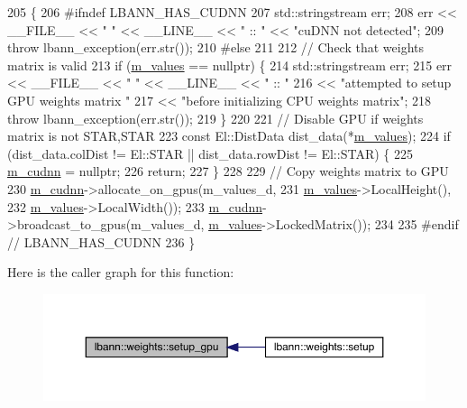 \begin{DoxyCode}
205                         \{
206 \textcolor{preprocessor}{  #ifndef LBANN\_HAS\_CUDNN}
207   std::stringstream err;
208   err << \_\_FILE\_\_ << \textcolor{stringliteral}{" "} << \_\_LINE\_\_ << \textcolor{stringliteral}{" :: "} << \textcolor{stringliteral}{"cuDNN not detected"};
209   \textcolor{keywordflow}{throw} lbann\_exception(err.str());
210 \textcolor{preprocessor}{  #else}
211 
212   \textcolor{comment}{// Check that weights matrix is valid}
213   \textcolor{keywordflow}{if} (\hyperlink{classlbann_1_1weights_a6b2df671b6d4c4dd595477971eea0543}{m\_values} == \textcolor{keyword}{nullptr}) \{
214     std::stringstream err;
215     err << \_\_FILE\_\_ << \textcolor{stringliteral}{" "} << \_\_LINE\_\_ << \textcolor{stringliteral}{" :: "}
216         << \textcolor{stringliteral}{"attempted to setup GPU weights matrix "}
217         << \textcolor{stringliteral}{"before initializing CPU weights matrix"};
218     \textcolor{keywordflow}{throw} lbann\_exception(err.str());
219   \}
220 
221   \textcolor{comment}{// Disable GPU if weights matrix is not STAR,STAR}
223 \textcolor{comment}{}  \textcolor{keyword}{const} El::DistData dist\_data(*\hyperlink{classlbann_1_1weights_a6b2df671b6d4c4dd595477971eea0543}{m\_values});
224   \textcolor{keywordflow}{if} (dist\_data.colDist != El::STAR || dist\_data.rowDist != El::STAR) \{
225     \hyperlink{classlbann_1_1weights_a873e8c14998915e442d03b8dd7d2fdf7}{m\_cudnn} = \textcolor{keyword}{nullptr};
226     \textcolor{keywordflow}{return};
227   \}
228 
229   \textcolor{comment}{// Copy weights matrix to GPU}
230   \hyperlink{classlbann_1_1weights_a873e8c14998915e442d03b8dd7d2fdf7}{m\_cudnn}->allocate\_on\_gpus(m\_values\_d,
231                             \hyperlink{classlbann_1_1weights_a6b2df671b6d4c4dd595477971eea0543}{m\_values}->LocalHeight(),
232                             \hyperlink{classlbann_1_1weights_a6b2df671b6d4c4dd595477971eea0543}{m\_values}->LocalWidth());
233   \hyperlink{classlbann_1_1weights_a873e8c14998915e442d03b8dd7d2fdf7}{m\_cudnn}->broadcast\_to\_gpus(m\_values\_d, \hyperlink{classlbann_1_1weights_a6b2df671b6d4c4dd595477971eea0543}{m\_values}->LockedMatrix());
234 
235 \textcolor{preprocessor}{  #endif // LBANN\_HAS\_CUDNN}
236 \}
\end{DoxyCode}
Here is the caller graph for this function\+:\nopagebreak
\begin{figure}[H]
\begin{center}
\leavevmode
\includegraphics[width=350pt]{classlbann_1_1weights_a7137725a835a37ded1a5ad7f739224a7_icgraph}
\end{center}
\end{figure}
\mbox{\label{classlbann_1_1weights_ab1e71f962a7702d0aa023fedf1c99e98}} 
